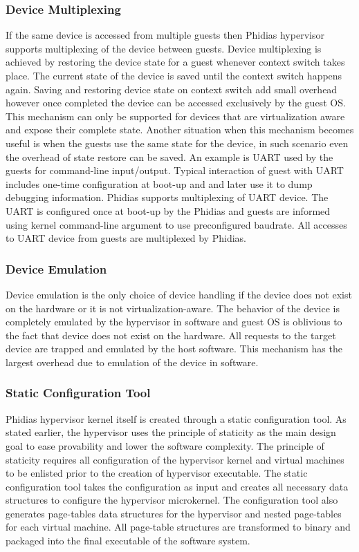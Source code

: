 \subsubsection{Device Multiplexing}
If the same device is accessed from multiple guests then Phidias hypervisor supports multiplexing of the device between guests. 
Device multiplexing is achieved by restoring the device state for a guest whenever context switch takes place. 
The current state of the device is saved until the context switch happens again. 
Saving and restoring device state on context switch add small overhead however once completed the device can be accessed exclusively by the guest OS.
This mechanism can only be supported for devices that are virtualization aware and expose their complete state.
Another situation when this mechanism becomes useful is when the guests use the same state for the device, in such scenario even the overhead of 
state restore can be saved. 
An example is UART used by the guests for command-line input/output.
Typical interaction of guest with UART includes one-time configuration at boot-up and
and later use it to dump debugging information.
Phidias supports multiplexing of UART device. The UART is configured once at boot-up by the Phidias and guests
are informed using kernel command-line argument to use preconfigured baudrate. 
All accesses to UART device from guests are multiplexed by Phidias.

\subsubsection{Device Emulation}
Device emulation is the only choice of device handling if the device does not exist on the hardware or it is not virtualization-aware.
The behavior of the device is completely emulated by the hypervisor in software and guest OS is oblivious to the fact that device does not exist on the hardware.
All requests to the target device are trapped and emulated by the host software. This mechanism has the largest overhead due to emulation of the device in software.

\subsubsection{Static Configuration Tool}
Phidias hypervisor kernel itself is created through a static configuration tool. 
As stated earlier, the hypervisor uses the principle of staticity as the main design goal to ease provability and lower the software complexity.
The principle of staticity requires all configuration of the hypervisor kernel and virtual machines to be enlisted prior to the creation of hypervisor executable. 
The static configuration tool takes the configuration as input and creates all necessary data structures to configure the hypervisor microkernel. 
The configuration tool also generates page-tables data structures for the hypervisor and nested page-tables for each virtual machine. 
All page-table structures are transformed to binary and packaged into the final executable of the software system.


